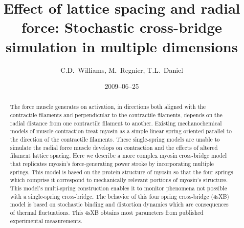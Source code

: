 \documentclass[]{article}
\title{Effect of lattice spacing and radial force: Stochastic cross-bridge simulation in multiple dimensions}
\author{C.D.\ Williams, M.\ Regnier, T.L.\ Daniel}
\date{2009--06--25}
\begin{document}
\maketitle{}

\begin{abstract} 
The force muscle generates on activation, in directions both aligned with the contractile filaments and perpendicular to the contractile filaments, depends on the radial distance from one contractile filament to another. 
Existing mechanochemical models of muscle contraction treat myosin as a simple linear spring oriented parallel to the direction of the contractile filaments.
These single-spring models are unable to simulate the radial force muscle develops on contraction and the effects of altered filament lattice spacing. 
Here we describe a more complex myosin cross-bridge model that replicates myosin's force-generating power stroke by incorporating multiple springs. 
This model is based on the protein structure of myosin so that the four springs which comprise it correspond to mechanically relevant portions of myosin's structure.
This model's multi-spring construction enables it to monitor phenomena not possible with a single-spring cross-bridge.
The behavior of this four spring cross-bridge (4sXB) model is based on stochastic binding and distortion dynamics which are consequences of thermal fluctuations.  
This 4sXB obtains most parameters from published experimental measurements.


\end{abstract}
\end{document}
